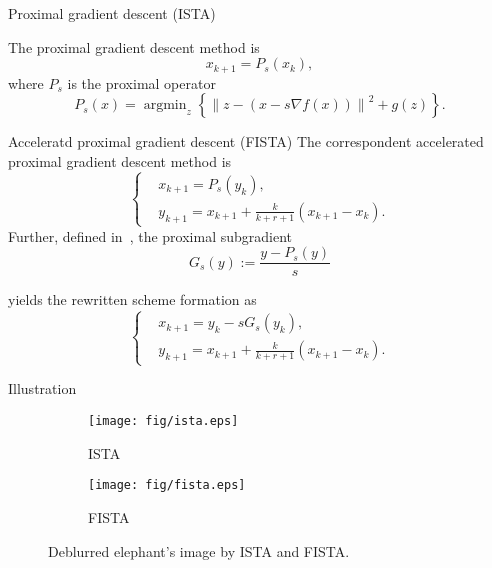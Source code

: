 \documentclass[10pt]{beamer}
\begin{document}
\begin{frame}{Proximal gradient descent (ISTA)}
  

  The proximal gradient descent method is 
  \begin{equation}\label{nonacc}
    x_{k+1} = P_s(x_k),
  \end{equation} 
  where $P_s$ is the proximal operator 
  \begin{equation*}
    P_s(x) = \mathop{\arg\min}_z \left\{\left\| z - \left( x - s\nabla f(x) \right) \right\|^2 + g(z) \right\}.
  \end{equation*}
\end{frame}

\begin{frame}{Acceleratd proximal gradient descent (FISTA)}
  The correspondent accelerated proximal gradient descent method is
  \begin{equation*}
    \left\{\begin{aligned}
      & x_{k+1} = P_s(y_k),              \\
      & y_{k+1} = x_{k+1}  + \frac{k}{k+r+1}(x_{k+1} - x_{k}).
      \end{aligned}\right.
  \end{equation*}
Further, defined in~\citet{su2016differential}, the proximal subgradient
\begin{equation*}
  G_s(y):= \frac{y - P_s(y)}{s}
\end{equation*}

yields the rewritten scheme formation as 
\begin{equation}\label{acc}
  \left\{\begin{aligned}
    & x_{k+1} = y_k - sG_s(y_k),              \\
    & y_{k+1} = x_{k+1}  + \frac{k}{k+r+1}(x_{k+1} - x_{k}).
    \end{aligned}\right.
\end{equation}
\end{frame}

\begin{frame}{Illustration}
  \begin{figure}[htpb!]
    \centering
    \begin{subfigure}[t]{0.48\linewidth}
    \centering
    \texttt{[image: fig/ista.eps]}
    \caption{ISTA}
    \end{subfigure}
    \begin{subfigure}[t]{0.48\linewidth}
    \centering
    \texttt{[image: fig/fista.eps]}
    \caption{FISTA}
    \end{subfigure}
    \caption{Deblurred elephant's image by ISTA and FISTA.} 
    \end{figure}
\end{frame}
\end{document}

